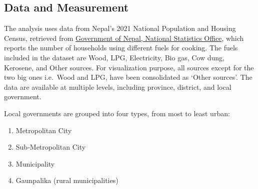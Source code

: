\documentclass[
  letterpaper,
  DIV=11,
  numbers=noendperiod]{scrartcl}
\providecommand{\tightlist}{%
  \setlength{\itemsep}{0pt}\setlength{\parskip}{0pt}}
\begin{document}
\subsection{Data and Measurement}\label{data-and-measurement}

The analysis uses data from Nepal's 2021 National Population and Housing
Census, retrieved from
\href{https://censusnepal.cbs.gov.np/results/population}{Government of
Nepal, National Statistics Office}, which reports the number of
households using different fuels for cooking. The fuels included in the
dataset are Wood, LPG, Electricity, Bio gas, Cow dung, Kerosene, and
Other sources. For visualization purpose, all sources except for the two
big ones i.e.~Wood and LPG, have been consolidated as `Other sources'.
The data are available at multiple levels, including province, district,
and local government.

Local governments are grouped into four types, from most to least urban:

\begin{enumerate}
\def\labelenumi{\arabic{enumi}.}
\tightlist
\item
  Metropolitan City
\item
  Sub‑Metropolitan City
\item
  Municipality
\item
  Gaunpalika (rural municipalities)
\end{enumerate}

\begingroup\fontsize{8}{10}\selectfont
\end{document}
